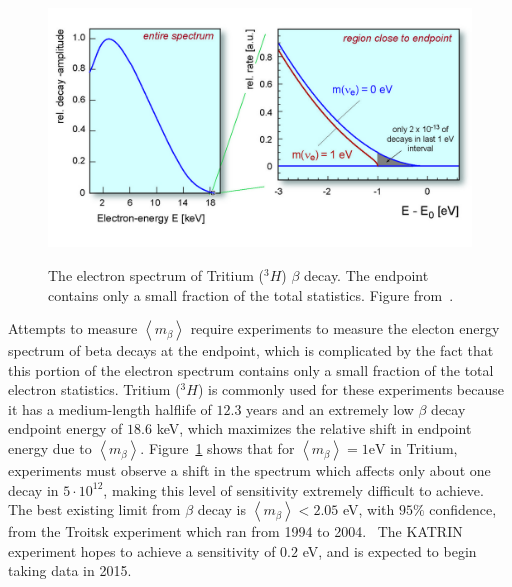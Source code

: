 \begin{figure}
\begin{center}
\includegraphics[keepaspectratio=true,width=\textwidth]{TritiumSpectrum.jpg}
\end{center}
\renewcommand{\baselinestretch}{1}
\small\normalsize
\begin{quote}
\caption{The electron spectrum of Tritium ($^3H$) $\beta$ decay.  The endpoint contains only a small fraction of the total statistics.  Figure from~\cite{Angrik:2005ep}.}
\label{fig:TritiumSpectrum}
\end{quote}
\end{figure}
\renewcommand{\baselinestretch}{2}
\small\normalsize

Attempts to measure $\left< m_\beta \right>$ require experiments to measure the electon energy spectrum of beta decays at the endpoint, which is complicated by the fact that this portion of the electron spectrum contains only a small fraction of the total electron statistics.  Tritium ($^3H$) is commonly used for these experiments because it has a medium-length halflife of $12.3$ years and an extremely low $\beta$ decay endpoint energy of $18.6$ keV, which maximizes the relative shift in endpoint energy due to $\left< m_\beta \right>$.  Figure~\ref{fig:TritiumSpectrum} shows that for $\left< m_\beta \right> = 1\text{eV}$ in Tritium, experiments must observe a shift in the spectrum which affects only about one decay in $5 \cdot 10^{12}$, making this level of sensitivity extremely difficult to achieve.  The best existing limit from $\beta$ decay is $\left<m_\beta\right> < 2.05$ eV, with $95\%$ confidence, from the Troitsk experiment which ran from 1994 to 2004.~\cite{OldTritium}  The KATRIN experiment hopes to achieve a sensitivity of $0.2$ eV, and is expected to begin taking data in 2015.~\cite{NewTritium}\cite{NewTritiumTimeline}

